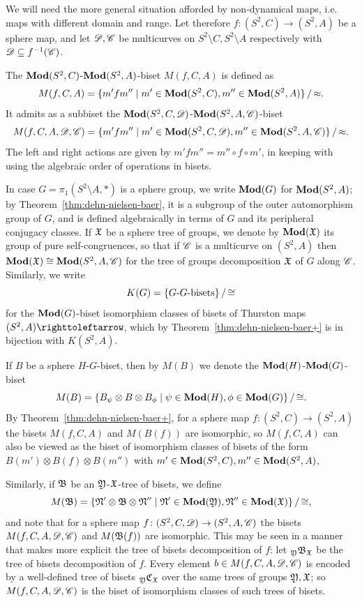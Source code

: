 \documentclass{amsart}
\begin{document}
We will need the more general situation afforded by non-dynamical
maps, i.e. maps with different domain and range. Let therefore
$f\colon(S^2,C)\to(S^2,A)$ be a sphere map, and let ${\mathscr D},{\mathscr C}$ be
multicurves on $S^2\setminus C,S^2\setminus A$ respectively with
${\mathscr D}\subseteq f^{-1}({\mathscr C})$.
\begin{defn}
\label{def:MapClassBis}
  The $\mathbf{\relax Mod}(S^2,C)$-$\mathbf{\relax Mod}(S^2,A)$-biset $M(f,C,A)$ is defined as
  \[M(f,C,A)=\{m'fm''\mid m'\in\mathbf{\relax Mod}(S^2,C),m''\in\mathbf{\relax Mod}(S^2,A)\}\,/\,{\approx}.\]
  It admits as a subbiset the  $\mathbf{\relax Mod}(S^2,C,{\mathscr D})$-$\mathbf{\relax Mod}(S^2,A,{\mathscr C})$-biset
  \[M(f,C,A,{\mathscr D},{\mathscr C})=\{m'fm''\mid m'\in\mathbf{\relax Mod}(S^2,C,{\mathscr D}),m''\in\mathbf{\relax Mod}(S^2,A,{\mathscr C})\}\,/\,{\approx}.\]
  The left and right actions are given by
  $m'fm''=m''\circ f\circ m'$, in keeping with using the algebraic
  order of operations in bisets.
\end{defn}

In case $G=\pi_1(S^2\setminus A,*)$ is a sphere group, we write
$\mathbf{\relax Mod}(G)$ for $\mathbf{\relax Mod}(S^2,A)$; by Theorem~\ref{thm:dehn-nielsen-baer},
it is a subgroup of the outer automorphism group of $G$, and is
defined algebraically in terms of $G$ and its peripheral conjugacy
classes. If ${\mathfrak X}$ be a sphere tree of groups, we denote by $\mathbf{\relax Mod}({\mathfrak X})$
its group of pure self-congruences, so that if ${\mathscr C}$ is a multicurve
on $(S^2,A)$ then $\mathbf{\relax Mod}({\mathfrak X})\cong\mathbf{\relax Mod}(S^2,A,{\mathscr C})$ for the tree of
groups decomposition ${\mathfrak X}$ of $G$ along ${\mathscr C}$. Similarly, we write
\[K(G)=\{\text{$G$-$G$-\text{bisets}}\}\,/\,{\cong}
\]
for the $\mathbf{\relax Mod}(G)$-biset isomorphism classes of bisets of Thurston maps
$(S^2,A)\selfmap$, which by Theorem~\ref{thm:dehn-nielsen-baer+} is in
bijection with $K(S^2,A)$.

If $B$ be a sphere $H$-$G$-biset, then by $M(B)$ we denote the
$\mathbf{\relax Mod}(H)$-$\mathbf{\relax Mod}(G)$-biset
\[M(B)=\{B_\psi\otimes B\otimes
  B_\phi\mid\psi\in\mathbf{\relax Mod}(H),\phi\in\mathbf{\relax Mod}(G)\}\,/\,{\cong}.
\]
By Theorem~\ref{thm:dehn-nielsen-baer+}, for a sphere map
$f\colon(S^2,C)\to(S^2,A)$ the bisets $M(f,C,A)$ and $M(B(f))$ are
isomorphic, so $M(f,C,A)$ can also be viewed as the biset of
isomorphism classes of bisets of the form
$B(m')\otimes B(f)\otimes B(m'')$ with
$m'\in\mathbf{\relax Mod}(S^2,C),m''\in\mathbf{\relax Mod}(S^2,A)$,

Similarly, if ${\mathfrak B}$ be an ${\mathfrak Y}$-${\mathfrak X}$-tree of bisets,
we define
\[M({\mathfrak B})=\{\mathfrak N' \otimes {\mathfrak B} \otimes
  \mathfrak N''\mid \mathfrak N'\in\mathbf{\relax Mod}({\mathfrak Y}),\mathfrak
  N''\in\mathbf{\relax Mod}({\mathfrak X})\}\,/\,{\cong},
\]
and note that for a sphere map $f\colon(S^2,C,{\mathscr D})\to(S^2,A,{\mathscr C})$ the
bisets $M(f,C,A,{\mathscr D},{\mathscr C})$ and $M({\mathfrak B}(f))$ are isomorphic. This
may be seen in a manner that makes more explicit the tree of bisets
decomposition of $f$: let $\subscript\gfY\gfB_\gf$ be the
tree of bisets decomposition of $f$. Every element
$b\in M(f,C,A,{\mathscr D},{\mathscr C})$ is encoded by a well-defined tree of bisets
$\subscript\gfY\gfC_\gf$ over the same trees of groups
${\mathfrak Y},{\mathfrak X}$; so $M(f,C,A,{\mathscr D},{\mathscr C})$ is the biset of isomorphism
classes of such trees of bisets.
\end{document}
